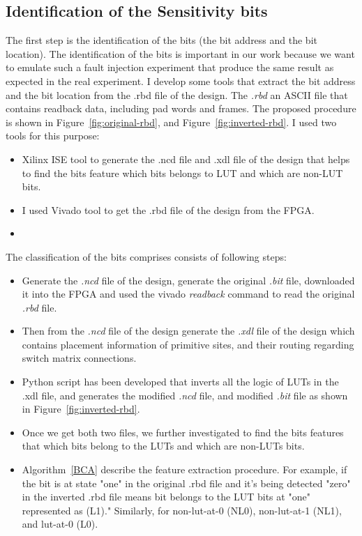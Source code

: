 \subsection{Identification of the Sensitivity bits}
\label{SE-bits}
The first step is the identification of the bits (the bit address and the bit location). The identification of the bits is important in our work because we want to emulate such a fault injection experiment that produce the same result as expected in the real experiment.
I develop some tools that extract the bit address and the bit location from the .rbd file of the design. The \textit{.rbd} an ASCII file that contains readback data, including pad words and frames.
The proposed procedure is shown in Figure~\ref{fig:original-rbd}, and Figure~\ref{fig:inverted-rbd}.  I used two tools for this purpose: 
\begin{itemize}
\item Xilinx ISE tool to generate the .ncd file and .xdl file of the design that helps to find the bits feature which bits belongs to LUT and which are non-LUT bits.
\item I used Vivado tool to get the .rbd file of the design from the FPGA.

\item 
\end{itemize}

The classification of the bits comprises consists of following steps:
\begin{itemize}
\item Generate the \textit{.ncd} file of the design, generate the original \textit{.bit} file, downloaded it into the FPGA and used the vivado \textit{readback} command to read the original \textit{.rbd} file.
\item Then from the \textit{.ncd} file of the design generate the \textit{.xdl} file of the design  which contains placement information of primitive sites, and their routing regarding switch matrix connections.
\item Python script has been developed that inverts all the logic of LUTs in the .xdl file, and generates the modified \textit{.ncd} file, and modified \textit{.bit} file as shown in Figure~\ref{fig:inverted-rbd}.
\item Once we get both two files, we further investigated to find the bits features that which bits belong to the LUTs and which are non-LUTs bits.
\item Algorithm~\ref{BCA} describe the feature extraction procedure. For example, if the bit is at state "one" in the original .rbd file and it's being detected "zero" in the inverted .rbd file means bit belongs to the LUT bits at "one" represented as (L1)." Similarly, for non-lut-at-0 (NL0), non-lut-at-1 (NL1), and lut-at-0 (L0). 
\end{itemize}

